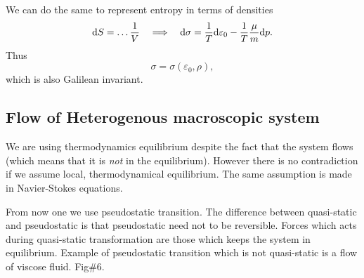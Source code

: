   We can do the same to represent entropy in terms of densities
  \begin{displaymath}
    \mathrm{d} S = \dots \frac{1}{V} \quad \Longrightarrow \quad  \mathrm{d} \sigma = \frac{1}{T} \mathrm{d} \varepsilon_0 - \frac{1}{T} \frac{\mu}{m} \mathrm{d} p.
  \end{displaymath}
  Thus
  \begin{displaymath}
    \sigma = \sigma(\varepsilon_0, \rho),
  \end{displaymath}
  which is also Galilean invariant.


  \subsection{Flow of Heterogenous macroscopic system}
  We are using thermodynamics equilibrium despite the fact that the system flows (which means that it is \emph{not} in the equilibrium).
  However there is no contradiction if we assume local, thermodynamical equilibrium.
  The same assumption is made in Navier-Stokes equations.

  From now one we use pseudostatic transition.
  The difference between quasi-static and pseudostatic is that pseudostatic need not to be reversible.
  Forces which acts during quasi-static transformation are those which keeps the system in equilibrium.
  Example of pseudostatic transition which is not quasi-static is a flow of viscose fluid.
  \todo Fig\#6.

  \begin{figure}
    \centering
    \label{fig:1.6}
  \end{figure}
  
